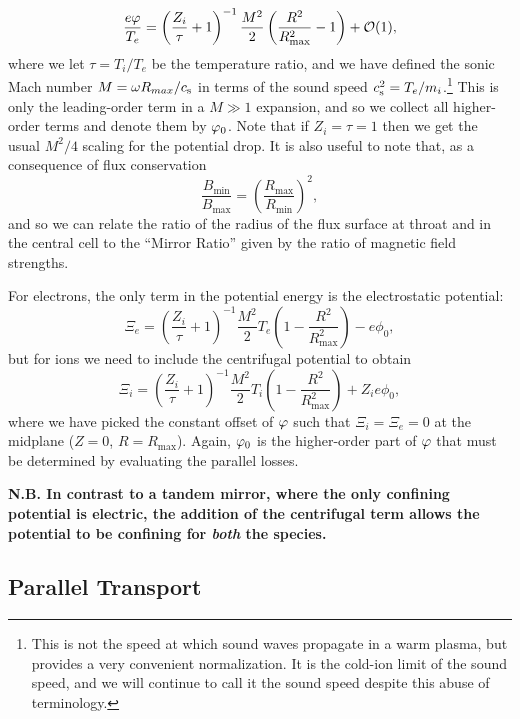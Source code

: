 \documentclass{revtex4}
\begin{document}
\begin{equation}
\frac{e \varphi}{T_e} = \left( \frac{Z_i}{\tau} + 1 \right)^{-1} \frac{M^2}{2} \left( \frac{R^2}{R_{\mathrm{max}}^2} - 1 \right) + \mathcal{O}(1),
\end{equation}
where we let $\tau = T_i/T_e$ be the temperature ratio, and we have defined the sonic Mach number $M = \omega R_{max} / c_{\mathrm{s}}$ in terms of the sound speed $c_{\mathrm{s}}^2 = T_e / m_i$.\footnote{This is not the speed at which sound waves propagate in a warm plasma, but provides a very convenient normalization. It is the cold-ion limit of the sound speed, and we will continue to call it the sound speed despite this abuse of terminology.}
This is only the leading-order term in a $M \gg 1$ expansion, and so we collect all higher-order terms and denote them by $\varphi_0$.
Note that if $Z_i = \tau = 1$ then we get the usual $M^2/4$ scaling for the potential drop. 
It is also useful to note that, as a consequence of flux conservation
	\begin{equation}
	\frac{B_{\mathrm{min}}}{B_{\mathrm{max}}} = \left(\frac{R_{\mathrm{max}}}{R_{\mathrm{min}}}\right)^2, 
\end{equation}
and so we can relate the ratio of the radius of the flux surface at throat and in the central cell to the ``Mirror Ratio'' given by the ratio of magnetic field strengths.

For electrons, the only term in the potential energy is the electrostatic potential:
\begin{equation}
\Xi_e = \left( \frac{Z_i}{\tau} + 1 \right)^{-1} \frac{M^2}{2} T_e \left( 1 - \frac{R^2}{R_{\mathrm{max}}^2} \right) - e \phi_0,
\end{equation}
but for ions we need to include the centrifugal potential to obtain
\begin{equation}
\Xi_i = \left( \frac{Z_i}{\tau} + 1 \right)^{-1} \frac{M^2}{2} T_i \left( 1 - \frac{R^2}{R_{\mathrm{max}}^2} \right) + Z_i e \phi_0,
\end{equation}
where we have picked the constant offset of $\varphi$ such that $\Xi_i = \Xi_e = 0$ at the midplane ($Z=0$, $R=R_{\mathrm{max}}$). Again, $\varphi_0$ is the higher-order part of $\varphi$ that must be determined by evaluating the parallel losses.

\textbf{N.B. In contrast to a tandem mirror, where the only confining potential is electric, the addition of the centrifugal term allows the 
	potential to be confining for \textit{both} the species.}

\subsection{Parallel Transport}
\end{document}

